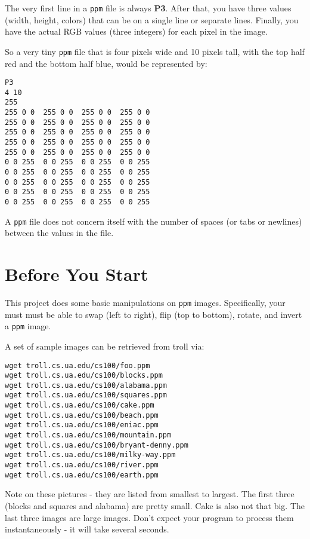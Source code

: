 \documentclass[12pt]{article}
\begin{document}
The very first line in a {\tt ppm} file is always {\bf P3}.  After that, you have
three values (width, height, colors) that can be on a single line or separate lines.
Finally, you have the actual RGB values (three integers) for each pixel in the image.

So a very tiny {\tt ppm} file that is four pixels wide and 10 pixels tall, with the top
half red and the bottom half blue, would be represented by:

\begin{verbatim}
P3
4 10
255
255 0 0  255 0 0  255 0 0  255 0 0
255 0 0  255 0 0  255 0 0  255 0 0
255 0 0  255 0 0  255 0 0  255 0 0
255 0 0  255 0 0  255 0 0  255 0 0
255 0 0  255 0 0  255 0 0  255 0 0
0 0 255  0 0 255  0 0 255  0 0 255
0 0 255  0 0 255  0 0 255  0 0 255
0 0 255  0 0 255  0 0 255  0 0 255
0 0 255  0 0 255  0 0 255  0 0 255
0 0 255  0 0 255  0 0 255  0 0 255
\end{verbatim}

A {\tt ppm} file does not concern itself with the number of spaces (or tabs or newlines)
between the values in the file.

\section*{Before You Start}

This project does some basic manipulations on {\tt ppm} images.  Specifically,
your must must be able to swap (left to right), flip (top to bottom), rotate, and
invert a {\tt ppm} image.

A set of sample images can be retrieved from troll via:

\begin{verbatim}
wget troll.cs.ua.edu/cs100/foo.ppm
wget troll.cs.ua.edu/cs100/blocks.ppm
wget troll.cs.ua.edu/cs100/alabama.ppm
wget troll.cs.ua.edu/cs100/squares.ppm
wget troll.cs.ua.edu/cs100/cake.ppm
wget troll.cs.ua.edu/cs100/beach.ppm
wget troll.cs.ua.edu/cs100/eniac.ppm
wget troll.cs.ua.edu/cs100/mountain.ppm
wget troll.cs.ua.edu/cs100/bryant-denny.ppm
wget troll.cs.ua.edu/cs100/milky-way.ppm
wget troll.cs.ua.edu/cs100/river.ppm
wget troll.cs.ua.edu/cs100/earth.ppm
\end{verbatim}

Note on these pictures - they are listed from smallest to largest.
The first three (blocks and squares and alabama) are pretty small.
Cake is also not that big.
The last three images are large images.  Don't expect your program to
process them instantaneously - it will take several seconds.
\end{document}
